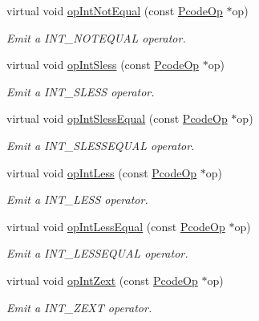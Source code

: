 \begin{DoxyCompactItemize}
virtual void \mbox{\hyperlink{class_print_c_ab3549a10d3642acc700ec596a82afee9}{op\+Int\+Not\+Equal}} (const \mbox{\hyperlink{class_pcode_op}{Pcode\+Op}} $\ast$op)
\begin{DoxyCompactList}\small\item\em Emit a I\+N\+T\+\_\+\+N\+O\+T\+E\+Q\+U\+AL operator. \end{DoxyCompactList}\item 
virtual void \mbox{\hyperlink{class_print_c_a067aae27ca81cdc2f8510be48bac6028}{op\+Int\+Sless}} (const \mbox{\hyperlink{class_pcode_op}{Pcode\+Op}} $\ast$op)
\begin{DoxyCompactList}\small\item\em Emit a I\+N\+T\+\_\+\+S\+L\+E\+SS operator. \end{DoxyCompactList}\item 
virtual void \mbox{\hyperlink{class_print_c_a049e9df6ff521b22fdf0147808b7cb19}{op\+Int\+Sless\+Equal}} (const \mbox{\hyperlink{class_pcode_op}{Pcode\+Op}} $\ast$op)
\begin{DoxyCompactList}\small\item\em Emit a I\+N\+T\+\_\+\+S\+L\+E\+S\+S\+E\+Q\+U\+AL operator. \end{DoxyCompactList}\item 
virtual void \mbox{\hyperlink{class_print_c_ae9e6662b76b5ce215c9c6f9974d04ead}{op\+Int\+Less}} (const \mbox{\hyperlink{class_pcode_op}{Pcode\+Op}} $\ast$op)
\begin{DoxyCompactList}\small\item\em Emit a I\+N\+T\+\_\+\+L\+E\+SS operator. \end{DoxyCompactList}\item 
virtual void \mbox{\hyperlink{class_print_c_a96fea2829e7c21a7959d3f8590c2ce2f}{op\+Int\+Less\+Equal}} (const \mbox{\hyperlink{class_pcode_op}{Pcode\+Op}} $\ast$op)
\begin{DoxyCompactList}\small\item\em Emit a I\+N\+T\+\_\+\+L\+E\+S\+S\+E\+Q\+U\+AL operator. \end{DoxyCompactList}\item 
virtual void \mbox{\hyperlink{class_print_c_aa4beb86be1b8b832edc49f039603959d}{op\+Int\+Zext}} (const \mbox{\hyperlink{class_pcode_op}{Pcode\+Op}} $\ast$op)
\begin{DoxyCompactList}\small\item\em Emit a I\+N\+T\+\_\+\+Z\+E\+XT operator. \end{DoxyCompactList}\item 

\end{DoxyCompactItemize}
